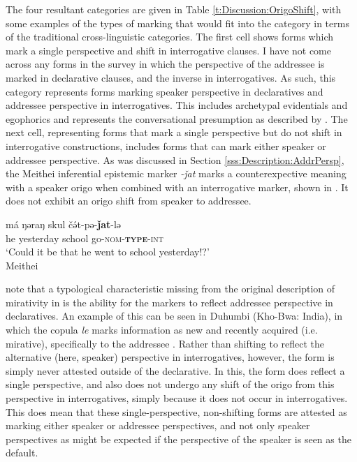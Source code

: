 The four resultant categories are given in Table \ref{t:Discussion:OrigoShift}, with some examples of the types of marking that would fit into the category in terms of the traditional cross-linguistic categories. The first cell shows forms which mark a single perspective and shift in interrogative clauses. I have not come across any forms in the survey in which the perspective of the addressee is marked in declarative clauses, and the inverse in interrogatives. As such, this category represents forms marking speaker perspective in declaratives and addressee perspective in interrogatives. This includes archetypal evidentials and egophorics \cites{Aikhenvald2004}{EgoIntro} and represents the conversational presumption as described by . The next cell, representing forms that mark a single perspective but do not shift in interrogative constructions, includes forms that can mark either speaker or addressee perspective. As was discussed in Section \ref{sss:Description:AddrPersp}, the Meithei \cite[Internal Isolate: India,][]{Chelliah1997} inferential epistemic marker \textit{-ǰat} marks a counterexpective meaning with a speaker origo when combined with an interrogative marker, shown in . It does not exhibit an origo shift from speaker to addressee.

\begin{exe}
    \ex \label{e:Discussion:MeitheiInter}
    \gll má ŋəraŋ skul čə́t-pə-\textbf{ǰat}-lə \\
    he yesterday school go-\textsc{nom-\textbf{type}-int} \\
    \glt `Could it be that he went to school yesterday!?' \\
    Meithei \cite[Internal Isolate:India,][296]{Chelliah1997}
\end{exe}

 note that a typological characteristic missing from the original description of mirativity in  is the ability for the markers to reflect addressee perspective in declaratives. An example of this can be seen in Duhumbi (Kho-Bwa: India), in which the copula \textit{le} marks information as new and recently acquired (i.e. mirative), specifically to the addressee \cite[405]{Bodt2020}. Rather than shifting to reflect the alternative (here, speaker) perspective in interrogatives, however, the form is simply never attested outside of the declarative. In this, the form does reflect a single perspective, and also does not undergo any shift of the origo from this perspective in interrogatives, simply because it does not occur in interrogatives. This does mean that these single-perspective, non-shifting forms are attested as marking either speaker or addressee perspectives, and not only speaker perspectives as might be expected if the perspective of the speaker is seen as the default.

